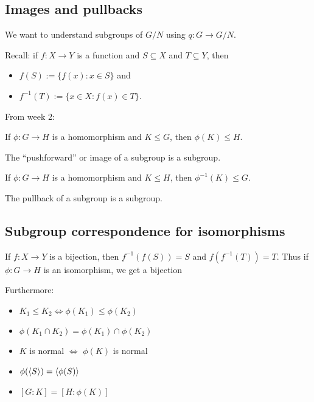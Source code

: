 \documentclass[12pt,letterpaper]{report}
\begin{document}
\pagebreak
\subsection{Images and pullbacks}

We want to understand subgroups of $G/N$ using $q \colon G \to G/N$.

Recall: if $f \colon X \to Y$ is a function and $S \subseteq X$ and $T \subseteq Y$, then
\begin{itemize}
  \item $f(S) := \{f(x) : x \in S\}$ and
  \item $f^{-1}(T) := \{x \in X : f(x) \in T\}$.
\end{itemize}

From week 2:

\begin{prop}{}{}
  If $\phi \colon G \to H$ is a homomorphism and $K \leq G$, then $\phi(K) \leq H$.
\end{prop}

The ``pushforward'' or image of a subgroup is a subgroup.

\begin{prop}{}{}
  If $\phi \colon G \to H$ is a homomorphism and $K \leq H$, then $\phi^{-1}(K) \leq G$.
\end{prop}

The pullback of a subgroup is a subgroup.

\pagebreak
\subsection{Subgroup correspondence for isomorphisms}

If $f \colon X \to Y$ is a bijection, then $f^{-1}(f(S)) = S$ and $f(f^{-1}(T)) = T$.
Thus if $\phi \colon G \to H$ is an isomorphism, we get a bijection
\begin{center}
\end{center}

Furthermore:
\begin{itemize}
  \item $K_1 \leq K_2 \iff \phi(K_1) \leq \phi(K_2)$
  \item $\phi(K_1 \cap K_2) = \phi(K_1) \cap \phi(K_2)$
  \item $K$ is normal $\iff$ $\phi(K)$ is normal
  \item $\phi(\langle S\rangle) = \langle\phi(S)\rangle$
  \item $[G : K] = [H : \phi(K)]$
\end{itemize}
\end{document}
